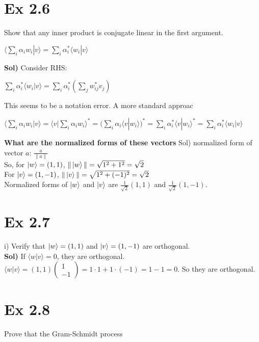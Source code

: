 \documentclass{article}
\newcommand{\0}{{$|0\rangle$}}
\newcommand{\1}{{$|1\rangle$}}
\begin{document}
\newpage

\section*{Ex 2.6}

Show that any inner product is conjugate linear in the first argument. 

$\langle \sum_i \alpha_i w_i | v \rangle = \sum_i \alpha_i^* \langle w_i | v \rangle$ 

\textbf{Sol)} Consider RHS: 

$\sum_i \alpha_i^* \langle w_i | v \rangle = \sum_i \alpha_i^* (\sum_j w_{ij}^* v_{j})$ 

This seems to be a notation error. A more standard approac

$\langle \sum_i \alpha_i w_i | v \rangle = \langle v | \sum_i \alpha_i w_i \rangle^* = (\sum_i \alpha_i \langle v | w_i \rangle)^* = \sum_i \alpha_i^* \langle v | w_i \rangle^* = \sum_i \alpha_i^* \langle w_i | v \rangle$

\textbf{What are the normalized forms of these vectors}
Sol) normalized form of vector $a$: $\frac{a}{\|a\|}$ \\
So, for $\ket{w} = (1,1)$, $\| \ket{w} \| = \sqrt{1^2+1^2} = \sqrt{2}$ \\
For $\ket{v} = (1,-1)$, $\| \ket{v} \| = \sqrt{1^2+(-1)^2} = \sqrt{2}$ \\
Normalized forms of $\ket{w}$ and $\ket{v}$ are $\frac{1}{\sqrt{2}}(1,1)$ and $\frac{1}{\sqrt{2}}(1,-1)$.

\newpage

\section*{Ex 2.7}

i) Verify that $\ket{w} = (1,1)$ and $\ket{v} = (1,-1)$ are orthogonal. \\
\textbf{Sol)} If $\langle w | v \rangle = 0$, they are orthogonal. \\
$\langle w | v \rangle = (1,1) \begin{pmatrix} 1 \\ -1 \end{pmatrix} = 1 \cdot 1 + 1 \cdot (-1) = 1-1=0$.
So they are orthogonal.

\newpage

\section*{Ex 2.8}
Prove that the Gram-Schmidt process
\end{document}
